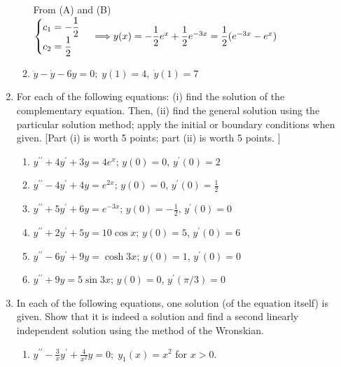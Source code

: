 \documentclass[fleqn]{article}
\begin{document}
\begin{enumerate}
\begin{enumerate}
        \textcolor{hwColor}{
          From (A) and (B) 
          $
            \begin{cases}
              c_1=-\dfrac{1}{2} \\
              c_2=\dfrac{1}{2}
            \end{cases} \\
            \\
            \Longrightarrow y(x)=-\dfrac{1}{2}e^x+\dfrac{1}{2}e^{-3x}=\dfrac{1}{2}(e^{-3x}-e^x)
          $
        }
      
      \item $\ddot{y}-\dot{y}-6y=0;\;y\left( 1\right) =4,\;\dot{y}\left( 1\right)=7$
      \end{enumerate}
    
    
    \item For each of the following equations: (i) find the solution of the complementary equation. Then, (ii) find the general solution using the particular solution method; apply the initial or boundary conditions when given. [Part (i) is worth 5 points; part (ii) is worth 5 points.  ]
    
      \begin{enumerate}
      \item $y^{\prime \prime }+4y^{\prime }+3y=4e^{x}$; $y\left( 0\right) =0$, $y^{\prime }\left( 0\right) =2$
      
      \item $y^{\prime \prime }-4y^{\prime }+4y=e^{2x}$; $y\left( 0\right) =0$, $y^{\prime }\left( 0\right) =\frac{1}{2}$
      
      \item $y^{\prime \prime }+5y^{\prime }+6y=e^{-3x}$; $y\left( 0\right) =-\frac{1}{2}$, $y^{\prime }\left( 0\right) =0$
      
      \item $y^{\prime \prime }+2y^{\prime }+5y=10\cos x$; $y\left( 0\right) =5$, $y^{\prime }\left( 0\right) =6$
      
      \item $y^{\prime \prime }-6y^{\prime }+9y=\cosh 3x$; $y\left( 0\right) =1$, $y^{\prime }\left( 0\right) =0$
      
      \item $y^{\prime \prime }+9y=5\sin 3x$; $y\left( 0\right) =0$, $y^{\prime}\left( \pi/3\right) =0$
      \end{enumerate}
    
    
    \item In each of the following equations, one solution (of the equation itself) is given. Show that it is indeed a solution and find a second linearly independent solution using the method of the Wronskian. 
      \begin{enumerate}
      \item $y^{\prime \prime }-\frac{\textstyle 3}{\textstyle x}y^{\prime }+\frac{\textstyle 4}{\textstyle x^{2}} y=0;\;y_{1}\left( x\right) =x^{2}$ for $x>0.$
      

\end{enumerate}
\end{enumerate}
\end{document}
